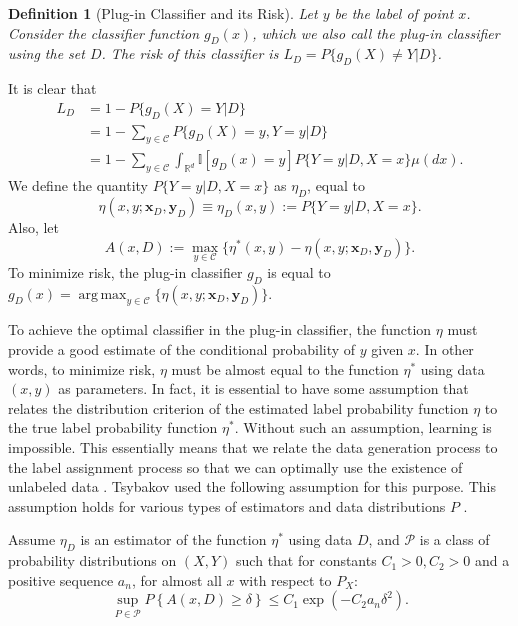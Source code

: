 \documentclass[12pt]{article}
\newtheorem{definition}{Definition}[section]
\DeclareMathOperator*{\argmax}{arg\,max}
\begin{document}
	\begin{definition}[Plug-in Classifier and its Risk]
		\label{def:plug-in}
		Let $y$ be the label of point $x$. Consider the classifier function $g_D(x)$, which we also call the plug-in classifier using the set $D$. The risk of this classifier is $L_D = P\{g_D(X) \neq Y | D\}$.
	\end{definition}
	
	It is clear that
	\begin{align}
		L_D &= 1 - P\{g_D(X) = Y | D\} \\
		&= 1 - \sum_{y \in \mathcal{C}} P\{g_D(X) = y, Y = y | D\} \\
		&= 1 - \sum_{y \in \mathcal{C}} \int_{\mathbb{R}^d} \mathbb{I}[g_D(x)=y] P\{Y = y | D, X = x\} \mu(dx).
	\end{align}
	We define the quantity $P\{Y = y | D, X = x\}$ as $\eta_D$, equal to
	\begin{equation}
		\eta(x, y; \mathbf{x}_D, \mathbf{y}_D) \equiv \eta_D(x, y) := P\{Y = y | D, X = x\}.
	\end{equation}
	Also, let
	\begin{equation}
		A(x, D) := \max_{y \in \mathcal{C}} \{\eta^*(x, y) - \eta(x, y; \mathbf{x}_D, \mathbf{y}_D)\}.
	\end{equation}
	To minimize risk, the plug-in classifier $g_D$ is equal to $g_D(x) = \argmax_{y \in \mathcal{C}} \{\eta(x, y; \mathbf{x}_D, \mathbf{y}_D)\}$.
	
	To achieve the optimal classifier in the plug-in classifier, the function $\eta$ must provide a good estimate of the conditional probability of $y$ given $x$. In other words, to minimize risk, $\eta$ must be almost equal to the function $\eta^*$ using data $(x, y)$ as parameters. In fact, it is essential to have some assumption that relates the distribution criterion of the estimated label probability function $\eta$ to the true label probability function $\eta^*$. Without such an assumption, learning is impossible. This essentially means that we relate the data generation process to the label assignment process so that we can optimally use the existence of unlabeled data \cite{tsybakov2004introduction}. Tsybakov used the following assumption for this purpose. This assumption holds for various types of estimators and data distributions $P$ \cite{audibert2007fast, baxter2001direct}.
	
	\begin{assumption}
		Assume $\eta_D$ is an estimator of the function $\eta^*$ using data $D$, and $\mathcal{P}$ is a class of probability distributions on $(X, Y)$ such that for constants $C_1 > 0, C_2 > 0$ and a positive sequence $a_n$, for almost all $x$ with respect to $P_X$:
		\begin{equation}
			\sup_{P \in \mathcal{P}} P\left\{ A(x, D) \ge \delta \right\} \le C_1 \exp(-C_2 a_n \delta^2).
		\end{equation}
	\end{assumption}
	
\end{document}
